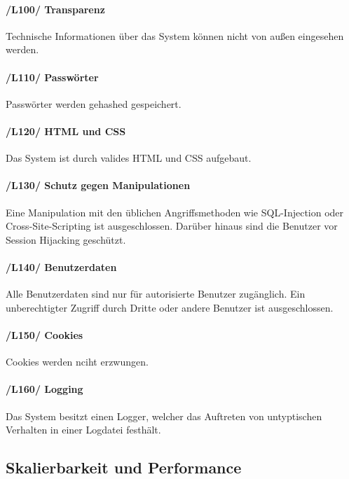 \documentclass{article}
\begin{document}
	\paragraph{/L100/ \label{L100} Transparenz}
    Technische Informationen über das System können nicht von außen eingesehen werden.
		   
   \paragraph{/L110/ \label{L110} Passwörter} Passwörter werden gehashed gespeichert.
   
    \paragraph{/L120/ \label{L120} HTML und CSS}
    Das System ist durch valides HTML und CSS aufgebaut.
    
    \paragraph{/L130/ \label{L130} Schutz gegen Manipulationen} Eine Manipulation mit den üblichen Angriffsmethoden wie SQL-Injection oder Cross-Site-Scripting ist ausgeschlossen. Darüber hinaus sind die Benutzer vor Session Hijacking geschützt.
   
    \paragraph{/L140/ \label{L140} Benutzerdaten}
   Alle Benutzerdaten sind nur für autorisierte Benutzer zugänglich.
   Ein unberechtigter Zugriff durch Dritte oder andere Benutzer ist ausgeschlossen.

   \paragraph{/L150/ \label{L150} Cookies}
   Cookies werden nciht erzwungen.
   
   \paragraph{/L160/ \label{L160} Logging}
    Das System besitzt einen Logger, welcher das Auftreten von untyptischen Verhalten in einer Logdatei festhält.

 \subsection{Skalierbarkeit und Performance}
\end{document}

